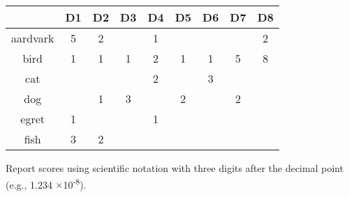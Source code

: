 \documentclass[11pt]{article}
\newcommand{\super}{\textsuperscript}
\newcommand{\mult}{$\times$}
\begin{document}
\begin{enumerate}
        \begin{table}[ht]
            \centering
            \begin{tabular}[t]{|c|c|c|c|c|c|c|c|c|}
                \hline
                & \textbf{D1} & \textbf{D2} & D3 & D4 & D5 & D6 & D7 & D8
                \\ \hline
                aardvark    & 5 & 2 &   & 1 &   &   &   & 2
                \\ \hline
                bird        & 1 & 1 & 1 & 2 & 1 & 1 & 5 & 8
                \\ \hline
                cat         &   &   &   & 2 &   & 3 &   &
                \\ \hline
                dog         &   & 1 & 3 &   & 2 &   & 2 &
                \\ \hline
                egret       & 1 &   &   & 1 &   &   &   &
                \\ \hline
                fish        & 3 & 2 &   &   &   &   &   &
                \\ \hline
            \end{tabular}
        \end{table}

        Report scores using scientific notation with three digits after the decimal point (e.g., 1.234 \mult 10\super{-8}).


\end{enumerate}
\end{document}
